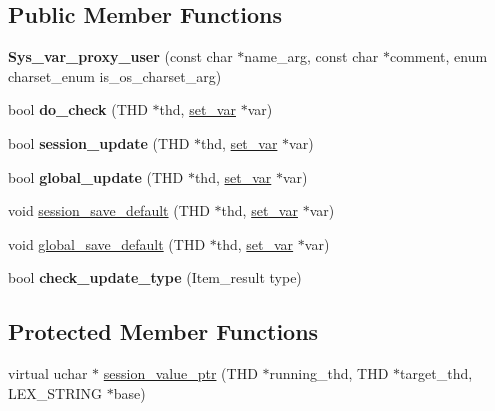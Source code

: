 \subsection*{Public Member Functions}
\begin{DoxyCompactItemize}
\item 
\mbox{\label{classSys__var__proxy__user_a6f4e5e16dbe71a64d45a9fe52a9c553d}} 
{\bfseries Sys\+\_\+var\+\_\+proxy\+\_\+user} (const char $\ast$name\+\_\+arg, const char $\ast$comment, enum charset\+\_\+enum is\+\_\+os\+\_\+charset\+\_\+arg)
\item 
\mbox{\label{classSys__var__proxy__user_a27e5f96249ad32ae286f8b58842a7ca4}} 
bool {\bfseries do\+\_\+check} (T\+HD $\ast$thd, \mbox{\hyperlink{classset__var}{set\+\_\+var}} $\ast$var)
\item 
\mbox{\label{classSys__var__proxy__user_ac4efe86677c6ad7cfe5c9c0c8105f3bb}} 
bool {\bfseries session\+\_\+update} (T\+HD $\ast$thd, \mbox{\hyperlink{classset__var}{set\+\_\+var}} $\ast$var)
\item 
\mbox{\label{classSys__var__proxy__user_a58d3b3b017a11f42a1efc25a6f773e4d}} 
bool {\bfseries global\+\_\+update} (T\+HD $\ast$thd, \mbox{\hyperlink{classset__var}{set\+\_\+var}} $\ast$var)
\item 
void \mbox{\hyperlink{classSys__var__proxy__user_ae35cbb27adc891da688c4428ebc7df7e}{session\+\_\+save\+\_\+default}} (T\+HD $\ast$thd, \mbox{\hyperlink{classset__var}{set\+\_\+var}} $\ast$var)
\item 
void \mbox{\hyperlink{classSys__var__proxy__user_a261981ce30b908f8a6f2cb697576f578}{global\+\_\+save\+\_\+default}} (T\+HD $\ast$thd, \mbox{\hyperlink{classset__var}{set\+\_\+var}} $\ast$var)
\item 
\mbox{\label{classSys__var__proxy__user_aed577fd84a72c483567f7e136f0d18cf}} 
bool {\bfseries check\+\_\+update\+\_\+type} (Item\+\_\+result type)
\end{DoxyCompactItemize}
\subsection*{Protected Member Functions}
\begin{DoxyCompactItemize}
\item 
virtual uchar $\ast$ \mbox{\hyperlink{classSys__var__proxy__user_adb78f56144c8f7fd06d74c41777657d5}{session\+\_\+value\+\_\+ptr}} (T\+HD $\ast$running\+\_\+thd, T\+HD $\ast$target\+\_\+thd, L\+E\+X\+\_\+\+S\+T\+R\+I\+NG $\ast$base)
\end{DoxyCompactItemize}

